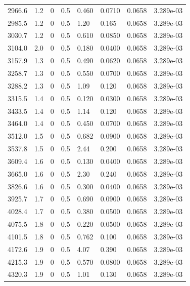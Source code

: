 \documentclass[preview]{standalone}
\begin{document}
{{{\begin{tabular}{L{1.2cm}C{1.2cm} C{0.3cm}C{0.5cm} C{1.4cm}C{1.4cm} C{1.4cm}C{1.4cm}}
  2966.6  &   1.2  & 0     & 0.5 &  0.460  & 0.0710  & 0.0658 &  3.289e-03   \\ 
  2985.5  &   1.2  & 0     & 0.5 &  1.20  & 0.165  & 0.0658 &  3.289e-03   \\ 
  3030.7  &   1.2  & 0     & 0.5 &  0.610  & 0.0850  & 0.0658 &  3.289e-03   \\ 
  3104.0  &   2.0  & 0     & 0.5 &  0.180  & 0.0400  & 0.0658 &  3.289e-03   \\ 
  3157.9  &   1.3  & 0     & 0.5 &  0.490  & 0.0620  & 0.0658 &  3.289e-03   \\ 
  3258.7  &   1.3  & 0     & 0.5 &  0.550  & 0.0700  & 0.0658 &  3.289e-03   \\ 
  3288.2  &   1.3  & 0     & 0.5 &  1.09  & 0.120  & 0.0658 &  3.289e-03   \\ 
  3315.5  &   1.4  & 0     & 0.5 &  0.120  & 0.0300  & 0.0658 &  3.289e-03   \\ 
  3433.5  &   1.4  & 0     & 0.5 &  1.14  & 0.120  & 0.0658 &  3.289e-03   \\ 
  3464.0  &   1.4  & 0     & 0.5 &  0.450  & 0.0700  & 0.0658 &  3.289e-03   \\ 
  3512.0  &   1.5  & 0     & 0.5 &  0.682  & 0.0900  & 0.0658 &  3.289e-03   \\ 
  3537.8  &   1.5  & 0     & 0.5 &  2.44  & 0.200  & 0.0658 &  3.289e-03   \\ 
  3609.4  &   1.6  & 0     & 0.5 &  0.130  & 0.0400  & 0.0658 &  3.289e-03   \\ 
  3665.0  &   1.6  & 0     & 0.5 &  2.30  & 0.240  & 0.0658 &  3.289e-03   \\ 
  3826.6  &   1.6  & 0     & 0.5 &  0.300  & 0.0400  & 0.0658 &  3.289e-03   \\ 
  3925.7  &   1.7  & 0     & 0.5 &  0.690  & 0.0900  & 0.0658 &  3.289e-03   \\ 
  4028.4  &   1.7  & 0     & 0.5 &  0.380  & 0.0500  & 0.0658 &  3.289e-03   \\ 
  4075.5  &   1.8  & 0     & 0.5 &  0.220  & 0.0500  & 0.0658 &  3.289e-03   \\ 
  4101.5  &   1.8  & 0     & 0.5 &  0.762  & 0.100  & 0.0658 &  3.289e-03   \\ 
  4172.6  &   1.9  & 0     & 0.5 &  4.07  & 0.390  & 0.0658 &  3.289e-03   \\ 
  4215.3  &   1.9  & 0     & 0.5 &  0.570  & 0.0800  & 0.0658 &  3.289e-03   \\ 
  4320.3  &   1.9  & 0     & 0.5 &  1.01  & 0.130  & 0.0658 &  3.289e-03   \\ 

\end{tabular}}}}
\end{document}
